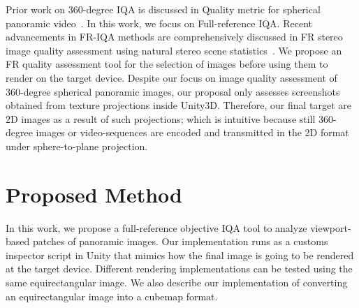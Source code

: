 \documentclass[10pt,conference,pdftex]{IEEEtran}
\begin{document}
Prior work on 360-degree IQA is discussed in Quality metric for spherical panoramic video~\cite{zakharchenko2016quality}. In this work, we focus on Full-reference IQA. Recent advancements in FR-IQA methods are comprehensively discussed in FR stereo image quality assessment using natural stereo scene statistics~\cite{md2015full}.  We propose an FR quality assessment tool for the selection of images before using them to render on the target device. Despite our focus on image quality assessment of 360-degree spherical panoramic images, our proposal only assesses screenshots obtained from texture projections inside Unity3D. Therefore, our final target are 2D images as a result of such projections; which is intuitive because still 360-degree images or video-sequences are encoded and transmitted in the 2D format under sphere-to-plane projection.

\section{Proposed Method}\label{sec:proposedMethod}

In this work, we propose a full-reference objective IQA tool to analyze viewport-based patches of panoramic images. Our implementation runs as a customs inspector script in Unity that mimics how the final image is going to be rendered at the target device. Different rendering implementations can be tested using the same equirectangular image. We also describe our implementation of converting an equirectangular image into a cubemap format.
\end{document}
